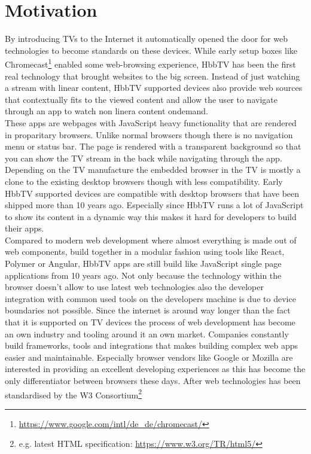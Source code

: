 \section{Motivation\label{sec:motivation}}

By introducing TVs to the Internet it automatically opened the door for web technologies to become standards
on these devices. While early setup boxes like Chromecast\footnote{\url{https://www.google.com/intl/de_de/chromecast/}}
enabled some web-browsing experience, HbbTV has been the first real technology that brought websites to the big screen.
Instead of just watching a stream with linear content, HbbTV supported devices also provide web sources that
contextually fits to the viewed content and allow the user to navigate through an app to watch non linera content
ondemand.\\
These apps are webpages with JavaScript heavy functionality that are rendered in proparitary browsers. Unlike
normal browsers though there is no navigation menu or status bar. The page is rendered with a transparent background
so that you can show the TV stream in the back while navigating through the app. Depending on the TV manufacture
the embedded browser in the TV is mostly a clone to the existing desktop browsers though with less compatibility.
Early HbbTV supported devices are compatible with desktop browsers that have been shipped more than 10 years ago.
Especially since HbbTV runs a lot of JavaScript to show its content in a dynamic way this makes it hard for
developers to build their apps.\\
Compared to modern web development where almost everything is made out of web components, build together in a
modular fashion using tools like React, Polymer or Angular, HbbTV apps are still build like JavaScript single
page applications from 10 years ago. Not only because the technology within the browser doesn't allow to use
latest web technologies also the developer integration with common used tools on the developers machine is due
to device boundaries not possible. Since the internet is around way longer than the fact that it is supported on
TV devices the process of web development has become an own industry and tooling around it an own market.
Companies constantly build frameworks, tools and integrations that makes building complex web apps easier and
maintainable. Especially browser vendors like Google or Mozilla are interested in providing an excellent
developing experiences as this has become the only differentiator between browsers these days. After web
technologies has been standardised by the W3 Consortium\footnote{e.g. latest HTML specification: \url{https://www.w3.org/TR/html5/}}
